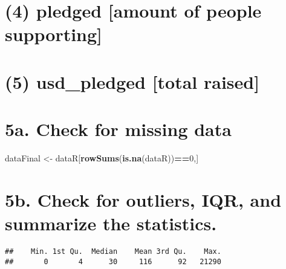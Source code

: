 \documentclass[
]{article}
\newenvironment{Shaded}{\begin{snugshade}}{\end{snugshade}}
\newcommand{\DecValTok}[1]{\textcolor[rgb]{0.00,0.00,0.81}{#1}}
\newcommand{\KeywordTok}[1]{\textcolor[rgb]{0.13,0.29,0.53}{\textbf{#1}}}
\newcommand{\NormalTok}[1]{#1}
\newcommand{\OperatorTok}[1]{\textcolor[rgb]{0.81,0.36,0.00}{\textbf{#1}}}
\newcommand{\StringTok}[1]{\textcolor[rgb]{0.31,0.60,0.02}{#1}}
\begin{document}
\hypertarget{pledged-amount-of-people-supporting}{%
\section{(4) pledged {[}amount of people
supporting{]}}\label{pledged-amount-of-people-supporting}}

\hypertarget{usd_pledged-total-raised}{%
\section{(5) usd\_pledged {[}total
raised{]}}\label{usd_pledged-total-raised}}

\hypertarget{a.-check-for-missing-data}{%
\section{5a. Check for missing data}\label{a.-check-for-missing-data}}

\begin{Shaded}
\begin{Highlighting}[]
\NormalTok{dataFinal <-}\StringTok{ }\NormalTok{dataR[}\KeywordTok{rowSums}\NormalTok{(}\KeywordTok{is.na}\NormalTok{(dataR))}\OperatorTok{==}\DecValTok{0}\NormalTok{,]}
\end{Highlighting}
\end{Shaded}

\hypertarget{b.-check-for-outliers-iqr-and-summarize-the-statistics.}{%
\section{5b. Check for outliers, IQR, and summarize the
statistics.}\label{b.-check-for-outliers-iqr-and-summarize-the-statistics.}}

\begin{Shaded}
\end{Shaded}

\begin{verbatim}
##    Min. 1st Qu.  Median    Mean 3rd Qu.    Max. 
##       0       4      30     116      92   21290
\end{verbatim}

\begin{Shaded}
\end{Shaded}
\end{document}
